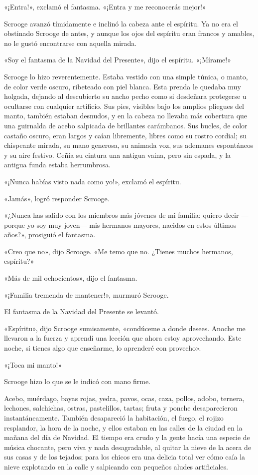 \documentclass{novela}
\begin{document}
 «¡Entra!», exclamó el fantasma. «¡Entra y me reconocerás mejor!»

 Scrooge avanzó tímidamente e inclinó la cabeza ante el espíritu. Ya no era el obstinado Scrooge de antes, y aunque los ojos del espíritu eran francos y amables, no le gustó encontrarse con aquella mirada.

 «Soy el fantasma de la Navidad del Presente», dijo el espíritu. «¡Mírame!»

 Scrooge lo hizo reverentemente. Estaba vestido con una simple túnica, o manto, de color verde oscuro, ribeteado con piel blanca. Esta prenda le quedaba muy holgada, dejando al descubierto su ancho pecho como si desdeñara protegerse u ocultarse con cualquier artificio. Sus pies, visibles bajo los amplios pliegues del manto, también estaban desnudos, y en la cabeza no llevaba más cobertura que una guirnalda de acebo salpicada de brillantes carámbanos. Sus bucles, de color castaño oscuro, eran largos y caían libremente, libres como su rostro cordial; su chispeante mirada, su mano generosa, su animada voz, sus ademanes espontáneos y su aire festivo. Ceñía su cintura una antigua vaina, pero sin espada, y la antigua funda estaba herrumbrosa.

 «¡Nunca habías visto nada como yo!», exclamó el espíritu.

 «Jamás», logró responder Scrooge.

 «¿Nunca has salido con los miembros más jóvenes de mi familia; quiero decir ---porque yo soy muy joven--- mis hermanos mayores, nacidos en estos últimos años?», prosiguió el fantasma.

 «Creo que no», dijo Scrooge. «Me temo que no. ¿Tienes muchos hermanos, espíritu?»

 «Más de mil ochocientos», dijo el fantasma.

 «¡Familia tremenda de mantener!», murmuró Scrooge.

 El fantasma de la Navidad del Presente se levantó.

 «Espíritu», dijo Scrooge sumisamente, «condúceme a donde desees. Anoche me llevaron a la fuerza y aprendí una lección que ahora estoy aprovechando. Este noche, si tienes algo que enseñarme, lo aprenderé con provecho».

 «¡Toca mi manto!»

 Scrooge hizo lo que se le indicó con mano firme.

 Acebo, muérdago, bayas rojas, yedra, pavos, ocas, caza, pollos, adobo, ternera, lechones, salchichas, ostras, pastelillos, tartas; fruta y ponche desaparecieron instantáneamente. También desapareció la habitación, el fuego, el rojizo resplandor, la hora de la noche, y ellos estaban en las calles de la ciudad en la mañana del día de Navidad. El tiempo era crudo y la gente hacía una especie de música chocante, pero viva y nada desagradable, al quitar la nieve de la acera de sus casas y de los tejados; para los chicos era una delicia total ver cómo caía la nieve explotando en la calle y salpicando con pequeños aludes artificiales.
\end{document}
